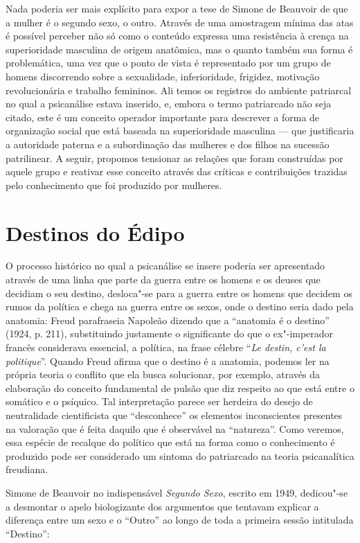 Nada poderia ser mais explícito para expor a tese de Simone de Beauvoir
de que a mulher é o segundo sexo, o outro. Através de uma amostragem
mínima das atas é possível perceber não só como o conteúdo expressa uma
resistência à crença na superioridade masculina de origem anatômica, mas
o quanto também sua forma é problemática, uma vez que o ponto de vista é
representado por um grupo de homens discorrendo sobre a sexualidade,
inferioridade, frigidez, motivação revolucionária e trabalho femininos.
Ali temos os registros do ambiente patriarcal no qual a psicanálise
estava inserido, e, embora o termo patriarcado não seja citado, este é
um conceito operador importante para descrever a forma de organização
social que está baseada na superioridade masculina --- que justificaria a
autoridade paterna e a subordinação das mulheres e dos filhos na
sucessão patrilinear. A seguir, propomos tensionar as relações que foram
construídas por aquele grupo e reativar esse conceito através das
críticas e contribuições trazidas pelo conhecimento que foi produzido
por mulheres.

\section{Destinos do Édipo}

O processo histórico no qual a psicanálise se insere poderia ser
apresentado através de uma linha que parte da guerra entre os homens e
os deuses que decidiam o seu destino, desloca"-se para a guerra entre os
homens que decidem os rumos da política e chega na guerra entre os
sexos, onde o destino seria dado pela anatomia: Freud parafraseia
Napoleão dizendo que a ``anatomia é o destino'' (1924, p. 211),
substituindo justamente o significante do que o ex"-imperador francês
considerava essencial, a política, na frase célebre ``\emph{Le destin,
c'est la politique}''. Quando Freud afirma que o destino é a anatomia,
podemos ler na própria teoria o conflito que ela busca solucionar, por
exemplo, através da elaboração do conceito fundamental de pulsão que diz
respeito ao que está entre o somático e o psíquico. Tal interpretação
parece ser herdeira do desejo de neutralidade cientificista que
``desconhece'' os elementos inconscientes presentes na valoração que é
feita daquilo que é observável na ``natureza''. Como veremos, essa
espécie de recalque do político que está na forma como o conhecimento é
produzido pode ser considerado um sintoma do patriarcado na teoria
psicanalítica freudiana.

Simone de Beauvoir no indispensável \emph{Segundo Sexo}, escrito em 1949,
dedicou"-se a desmontar o apelo biologizante dos argumentos que tentavam
explicar a diferença entre um sexo e o ``Outro'' ao longo de toda a
primeira sessão intitulada ``Destino'':

